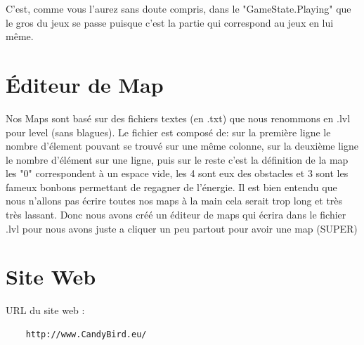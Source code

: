 \documentclass [11pt]{report}
\begin{document}
	\vspace{10mm}
	
	C'est, comme vous l'aurez sans doute compris, dans le "GameState.Playing" que le gros du jeux se passe puisque c'est la partie qui correspond au jeux en lui même.
	
	
	\vspace{10mm}
	
	
	\section{\'Editeur de Map}
	Nos Maps sont basé sur des fichiers textes (en .txt) que nous renommons en .lvl pour level (sans blagues). Le fichier est composé de: sur la première ligne le nombre d'élement pouvant se trouvé sur une même colonne, sur la deuxième ligne le nombre d'élément sur une ligne, puis sur le reste c'est la définition de la map %
	les "0" correspondent à un espace vide, les 4 sont eux des obstacles et 3 sont les fameux bonbons permettant de regagner de l'énergie.
	\indent Il est bien entendu que nous n'allons pas écrire toutes nos maps à la main cela serait trop long et très très lassant. Donc nous avons créé un éditeur de maps qui écrira dans le fichier .lvl pour nous avons juste a cliquer un peu partout pour avoir une map (SUPER) %
	 
	 \vspace{10mm}
	 
	\section{Site Web}
	
	URL du site web : 
	\begin{Verbatim}
	http://www.CandyBird.eu/
	\end{Verbatim}
	
\end{document}
